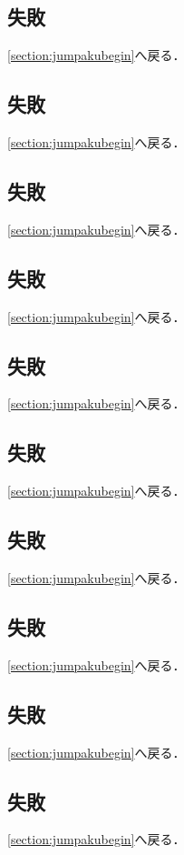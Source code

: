 \subsection{失敗}\label{subsection:jumpakulast2failure}\ref{section:jumpakubegin}へ戻る．\newpage

\subsection{失敗}\label{subsection:jumpakulast3failureA}\ref{section:jumpakubegin}へ戻る．\newpage
\subsection{失敗}\label{subsection:jumpakulast3failureB}\ref{section:jumpakubegin}へ戻る．\newpage
\subsection{失敗}\label{subsection:jumpakulast3failureC}\ref{section:jumpakubegin}へ戻る．\newpage
\subsection{失敗}\label{subsection:jumpakulast3failureD}\ref{section:jumpakubegin}へ戻る．\newpage
\subsection{失敗}\label{subsection:jumpakulast3failureE}\ref{section:jumpakubegin}へ戻る．\newpage
\subsection{失敗}\label{subsection:jumpakulast3failureF}\ref{section:jumpakubegin}へ戻る．\newpage
\subsection{失敗}\label{subsection:jumpakulast3failureG}\ref{section:jumpakubegin}へ戻る．\newpage
\subsection{失敗}\label{subsection:jumpakulast3failureH}\ref{section:jumpakubegin}へ戻る．\newpage
\subsection{失敗}\label{subsection:jumpakulast3failureI}\ref{section:jumpakubegin}へ戻る．\newpage
